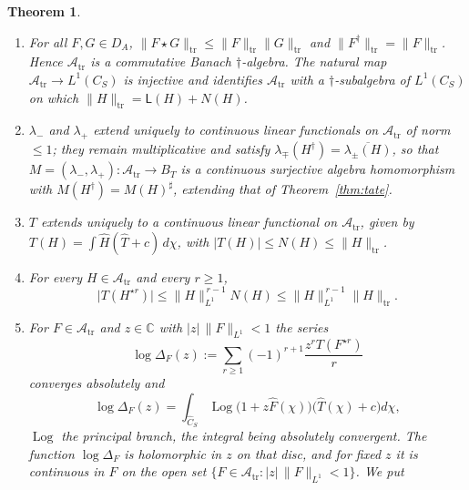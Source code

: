 \documentclass[11pt]{amsart}
\newtheorem{theorem}{Theorem}[section]
\theoremstyle{definition}
\theoremstyle{remark}
\newcommand{\C}{\mathbb C}
\newcommand{\Th}{\widehat{T}}
\newcommand{\Ch}{\widehat{C}_S}
\newcommand{\DA}{D_A}
\newcommand{\BT}{B_T}
\begin{document}
\begin{theorem}\label{thm:banach}
\begin{enumerate}
\item[(a)] For all $F,G\in\DA$,
$\lVert F\star G\rVert_{\mathrm{tr}}\le\lVert F\rVert_{\mathrm{tr}}
\lVert G\rVert_{\mathrm{tr}}$ and $\lVert F^{\dagger}\rVert_{\mathrm{tr}}
=\lVert F\rVert_{\mathrm{tr}}$.  Hence $\mathcal A_{\mathrm{tr}}$ is a commutative Banach
$\dagger$-algebra.  The natural map $\mathcal A_{\mathrm{tr}}\to L^{1}(C_S)$ is injective and
identifies $\mathcal A_{\mathrm{tr}}$ with a $\dagger$-subalgebra of $L^{1}(C_S)$ on which
$\lVert H\rVert_{\mathrm{tr}}=\mathsf L(H)+N(H)$.
\item[(b)] $\lambda_-$ and $\lambda_+$ extend uniquely to continuous linear
functionals on $\mathcal A_{\mathrm{tr}}$ of norm $\le1$; they remain multiplicative and satisfy
$\lambda_{\mp}(H^{\dagger})=\overline{\lambda_{\pm}(H)}$, so that
$M=(\lambda_-,\lambda_+):\mathcal A_{\mathrm{tr}}\to\BT$ is a continuous surjective algebra
homomorphism with $M(H^{\dagger})=M(H)^{\sharp}$, extending that of
Theorem~\ref{thm:tate}.
\item[(c)] $T$ extends uniquely to a continuous linear functional on $\mathcal A_{\mathrm{tr}}$,
given by $T(H)=\int\widehat H(\Th+c)\,d\chi$, with $|T(H)|\le N(H)\le
\lVert H\rVert_{\mathrm{tr}}$.
\item[(d)] For every $H\in\mathcal A_{\mathrm{tr}}$ and every $r\ge1$,
\begin{equation}\label{eq:powerest}
\bigl|T(H^{\star r})\bigr|\le\lVert H\rVert_{L^{1}}^{\,r-1}N(H)
\le\lVert H\rVert_{L^{1}}^{\,r-1}\lVert H\rVert_{\mathrm{tr}} .
\end{equation}
\item[(e)] For $F\in\mathcal A_{\mathrm{tr}}$ and $z\in\C$ with $|z|\,\lVert F\rVert_{L^{1}}<1$
the series
\begin{equation}\label{eq:germ}
\log\Delta_F(z):=\sum_{r\ge1}(-1)^{r+1}\frac{z^{r}T(F^{\star r})}{r}
\end{equation}
converges absolutely and
\begin{equation}\label{eq:germint}
\log\Delta_F(z)=\int_{\Ch}\operatorname{Log}\bigl(1+z\widehat F(\chi)\bigr)
\bigl(\Th(\chi)+c\bigr)d\chi ,
\end{equation}
$\operatorname{Log}$ the principal branch, the integral being absolutely convergent.  The
function $\log\Delta_F$ is holomorphic in $z$ on that disc, and for fixed $z$
it is continuous in $F$ on the open set
$\{F\in\mathcal A_{\mathrm{tr}}:|z|\,\lVert F\rVert_{L^{1}}<1\}$.  We put

\end{enumerate}
\end{theorem}
\end{document}
